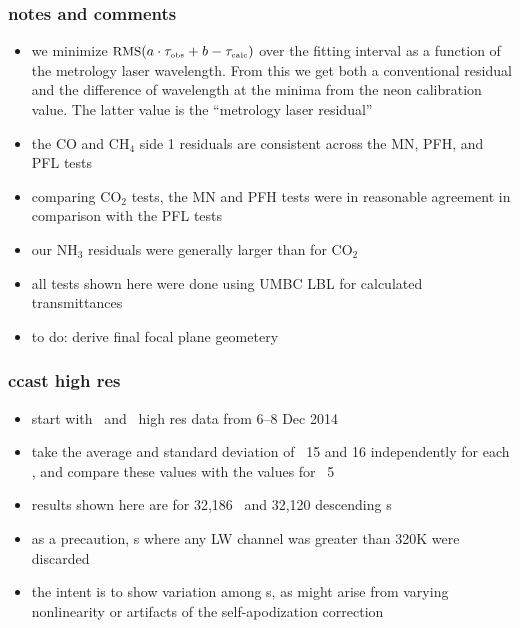 \documentclass[11pt]{beamer}
\begin{document}
\begin{frame}
\frametitle{notes and comments}

\begin{itemize}
 
  \item we minimize $\mbox{\small RMS}(a\cdot\tau_{\mbox{\tiny obs}} + b - \tau_{\mbox{\tiny calc}})$ over 
    the fitting interval as a function of the metrology laser
    wavelength.  From this we get both a conventional residual 
    and the difference of wavelength at the minima from the neon
    calibration value.  The latter value is the ``metrology laser
    residual''

  \item the CO and CH$_4$ side 1 residuals are consistent across the
    MN, PFH, and PFL tests

  \item comparing CO$_2$ tests, the MN and PFH tests were in
    reasonable agreement in comparison with the PFL tests

  \item our NH$_3$ residuals were generally larger than for CO$_2$

  \item all tests shown here were done using UMBC LBL for calculated
    transmittances

  \item to do: derive final focal plane geometery

\end{itemize}

\end{frame}
\begin{frame}
\frametitle{ccast high res}

\begin{itemize}

  \item start with \ccast\ and \noaa\ high res data from 6--8 Dec 2014

  \item take the average and standard deviation of \for\ 15 and 16
    independently for each \fov, and compare these values with the
    values for \fov\ 5

  \item results shown here are for 32,186 \ccast\ and 32,120 {\noaa}
    descending {\for}s

  \item as a precaution, {\for}s where any LW channel was greater than
    320K were discarded

  \item the intent is to show variation among {\fov}s, as might arise
    from varying nonlinearity or artifacts of the self-apodization
    correction

\end{itemize}

\end{frame}
\end{document}

